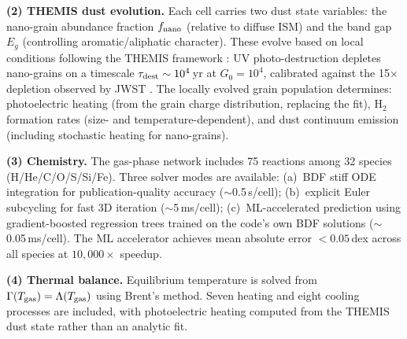 \documentclass[twocolumn,letterpaper]{article}
\newcommand{\Tgas}{T_{\rm gas}}
\newcommand{\Gzero}{G_0}
\newcommand{\HH}{\mathrm{H_2}}
\begin{document}
\smallskip\noindent\textbf{(2) THEMIS dust evolution.}
Each cell carries two dust state variables: the nano-grain abundance fraction $f_{\rm nano}$
(relative to diffuse ISM) and the band gap $E_g$ (controlling aromatic/aliphatic character).
These evolve based on local conditions following the THEMIS framework \citep{Jones2017}:
UV photo-destruction depletes nano-grains on a timescale $\tau_{\rm dest} \sim 10^4$\,yr
at $\Gzero = 10^4$, calibrated against the 15$\times$ depletion observed by JWST
\citep{Elyajouri2024}. The locally evolved grain population determines: photoelectric heating
(from the grain charge distribution, replacing the \citealt{Bakes1994} fit), $\HH$ formation
rates (size- and temperature-dependent), and dust continuum emission (including stochastic
heating for nano-grains).

\smallskip\noindent\textbf{(3) Chemistry.}
The gas-phase network includes 75 reactions among 32 species (H/He/C/O/S/Si/Fe).
Three solver modes are available: (a)~BDF stiff ODE integration for publication-quality
accuracy ($\sim$0.5\,s/cell); (b)~explicit Euler subcycling for fast 3D iteration
($\sim$5\,ms/cell); (c)~ML-accelerated prediction using gradient-boosted regression
trees trained on the code's own BDF solutions ($\sim$0.05\,ms/cell). The ML accelerator
achieves mean absolute error $<0.05$\,dex across all species at $10{,}000\times$ speedup.

\smallskip\noindent\textbf{(4) Thermal balance.}
Equilibrium temperature is solved from $\Gamma(\Tgas) = \Lambda(\Tgas)$ using Brent's
method. Seven heating and eight cooling processes are included, with photoelectric heating
computed from the THEMIS dust state rather than an analytic fit.
\end{document}
